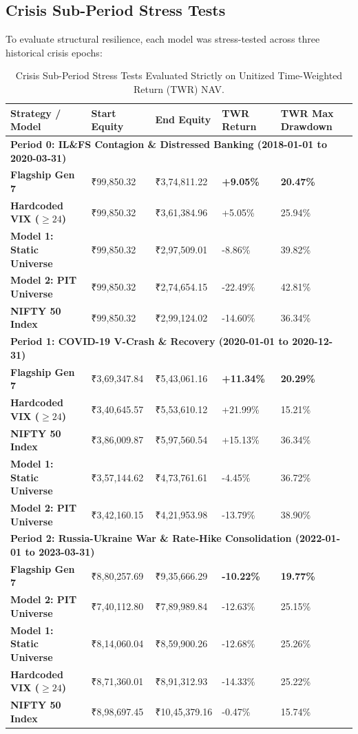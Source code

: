 \documentclass[11pt,a4paper]{article}
\begin{document}
\subsection{Crisis Sub-Period Stress Tests}
To evaluate structural resilience, each model was stress-tested across three historical crisis epochs:
\begin{table}[H]
\centering
\small
\begin{tabularx}{\textwidth}{lXXXX}
\toprule
\textbf{Strategy / Model} & \textbf{Start Equity} & \textbf{End Equity} & \textbf{TWR Return} & \textbf{TWR Max Drawdown} \\
\midrule
\multicolumn{5}{l}{\textbf{Period 0: IL\&FS Contagion \& Distressed Banking (2018-01-01 to 2020-03-31)}} \\
\textbf{Flagship Gen 7} & ₹99,850.32 & ₹3,74,811.22 & \textbf{+9.05\%} & \textbf{20.47\%} \\
\textbf{Hardcoded VIX ($\ge 24$)} & ₹99,850.32 & ₹3,61,384.96 & +5.05\% & 25.94\% \\
\textbf{Model 1: Static Universe} & ₹99,850.32 & ₹2,97,509.01 & -8.86\% & 39.82\% \\
\textbf{Model 2: PIT Universe} & ₹99,850.32 & ₹2,74,654.15 & -22.49\% & 42.81\% \\
\textbf{NIFTY 50 Index} & ₹99,850.32 & ₹2,99,124.02 & -14.60\% & 36.34\% \\
\midrule
\multicolumn{5}{l}{\textbf{Period 1: COVID-19 V-Crash \& Recovery (2020-01-01 to 2020-12-31)}} \\
\textbf{Flagship Gen 7} & ₹3,69,347.84 & ₹5,43,061.16 & \textbf{+11.34\%} & \textbf{20.29\%} \\
\textbf{Hardcoded VIX ($\ge 24$)} & ₹3,40,645.57 & ₹5,53,610.12 & +21.99\% & 15.21\% \\
\textbf{NIFTY 50 Index} & ₹3,86,009.87 & ₹5,97,560.54 & +15.13\% & 36.34\% \\
\textbf{Model 1: Static Universe} & ₹3,57,144.62 & ₹4,73,761.61 & -4.45\% & 36.72\% \\
\textbf{Model 2: PIT Universe} & ₹3,42,160.15 & ₹4,21,953.98 & -13.79\% & 38.90\% \\
\midrule
\multicolumn{5}{l}{\textbf{Period 2: Russia-Ukraine War \& Rate-Hike Consolidation (2022-01-01 to 2023-03-31)}} \\
\textbf{Flagship Gen 7} & ₹8,80,257.69 & ₹9,35,666.29 & \textbf{-10.22\%} & \textbf{19.77\%} \\
\textbf{Model 2: PIT Universe} & ₹7,40,112.80 & ₹7,89,989.84 & -12.63\% & 25.15\% \\
\textbf{Model 1: Static Universe} & ₹8,14,060.04 & ₹8,59,900.26 & -12.68\% & 25.26\% \\
\textbf{Hardcoded VIX ($\ge 24$)} & ₹8,71,360.01 & ₹8,91,312.93 & -14.33\% & 25.22\% \\
\textbf{NIFTY 50 Index} & ₹8,98,697.45 & ₹10,45,379.16 & -0.47\% & 15.74\% \\
\bottomrule
\end{tabularx}
\caption{Crisis Sub-Period Stress Tests Evaluated Strictly on Unitized Time-Weighted Return (TWR) NAV.}
\end{table}
\end{document}
